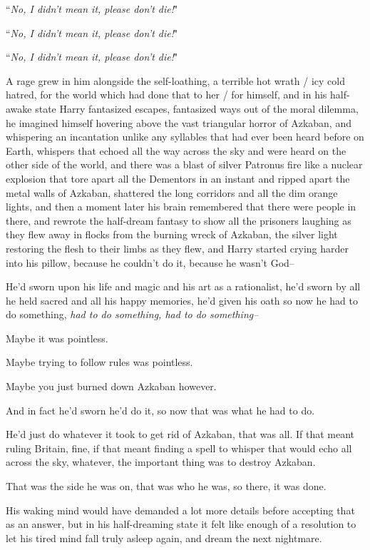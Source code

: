 ``\emph{No, I didn't mean it, please don't die!}"

``\emph{No, I didn't mean it, please don't die!}"

``\emph{No, I didn't mean it, please don't die!}"

A rage grew in him alongside the self-loathing, a terrible hot wrath / icy cold hatred, for the world which had done that to her / for himself, and in his half-awake state Harry fantasized escapes, fantasized ways out of the moral dilemma, he imagined himself hovering above the vast triangular horror of Azkaban, and whispering an incantation unlike any syllables that had ever been heard before on Earth, whispers that echoed all the way across the sky and were heard on the other side of the world, and there was a blast of silver Patronus fire like a nuclear explosion that tore apart all the Dementors in an instant and ripped apart the metal walls of Azkaban, shattered the long corridors and all the dim orange lights, and then a moment later his brain remembered that there were people in there, and rewrote the half-dream fantasy to show all the prisoners laughing as they flew away in flocks from the burning wreck of Azkaban, the silver light restoring the flesh to their limbs as they flew, and Harry started crying harder into his pillow, because he couldn't do it, because he wasn't God\---

He'd sworn upon his life and magic and his art as a rationalist, he'd sworn by all he held sacred and all his happy memories, he'd given his oath so now he had to do something, \emph{had to do something, had to \emph{do something\---}}

Maybe it was pointless.

Maybe trying to follow rules was pointless.

Maybe you just burned down Azkaban however.

And in fact he'd sworn he'd do it, so now that was what he had to do.

He'd just do whatever it took to get rid of Azkaban, that was all. If that meant ruling Britain, fine, if that meant finding a spell to whisper that would echo all across the sky, whatever, the important thing was to destroy Azkaban.

That was the side he was on, that was who he was, so there, it was done.

His waking mind would have demanded a lot more details before accepting that as an answer, but in his half-dreaming state it felt like enough of a resolution to let his tired mind fall truly asleep again, and dream the next nightmare.

